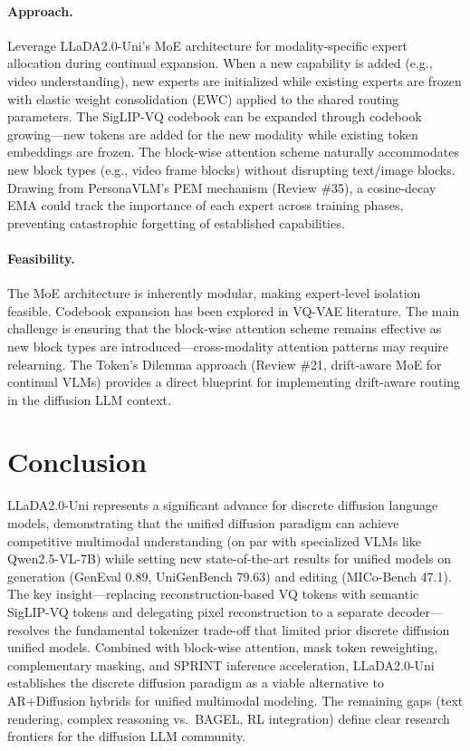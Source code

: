 \documentclass[11pt]{article}
\begin{document}
\paragraph{Approach.}
Leverage LLaDA2.0-Uni's MoE architecture for modality-specific expert allocation during continual expansion. When a new capability is added (e.g., video understanding), new experts are initialized while existing experts are frozen with elastic weight consolidation (EWC) applied to the shared routing parameters. The SigLIP-VQ codebook can be expanded through codebook growing---new tokens are added for the new modality while existing token embeddings are frozen. The block-wise attention scheme naturally accommodates new block types (e.g., video frame blocks) without disrupting text/image blocks. Drawing from PersonaVLM's PEM mechanism (Review \#35), a cosine-decay EMA could track the importance of each expert across training phases, preventing catastrophic forgetting of established capabilities.

\paragraph{Feasibility.}
The MoE architecture is inherently modular, making expert-level isolation feasible. Codebook expansion has been explored in VQ-VAE literature. The main challenge is ensuring that the block-wise attention scheme remains effective as new block types are introduced---cross-modality attention patterns may require relearning. The Token's Dilemma approach (Review \#21, drift-aware MoE for continual VLMs) provides a direct blueprint for implementing drift-aware routing in the diffusion LLM context.

\section{Conclusion}

LLaDA2.0-Uni represents a significant advance for discrete diffusion language models, demonstrating that the unified diffusion paradigm can achieve competitive multimodal understanding (on par with specialized VLMs like Qwen2.5-VL-7B) while setting new state-of-the-art results for unified models on generation (GenEval 0.89, UniGenBench 79.63) and editing (MICo-Bench 47.1). The key insight---replacing reconstruction-based VQ tokens with semantic SigLIP-VQ tokens and delegating pixel reconstruction to a separate decoder---resolves the fundamental tokenizer trade-off that limited prior discrete diffusion unified models. Combined with block-wise attention, mask token reweighting, complementary masking, and SPRINT inference acceleration, LLaDA2.0-Uni establishes the discrete diffusion paradigm as a viable alternative to AR+Diffusion hybrids for unified multimodal modeling. The remaining gaps (text rendering, complex reasoning vs.\ BAGEL, RL integration) define clear research frontiers for the diffusion LLM community.
\end{document}
